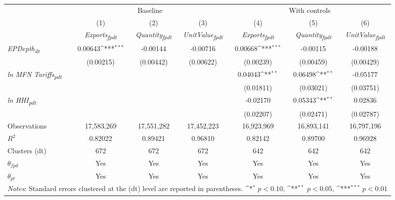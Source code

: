 {
\def\sym#1{\ifmmode^{#1}\else\(^{#1}\)\fi}
\begin{tabular}{l*{6}{c}}
\toprule
&\multicolumn{3}{c}{Baseline}&\multicolumn{3}{c}{With controls}\\\cmidrule(lr){2-4}\cmidrule(lr){5-7}
&(1)&(2)&(3)&(4)&(5)&(6)\\
&\textit{Exports\textsubscript{fpdt}}&\textit{Quantity\textsubscript{fpdt}}&\textit{UnitValue\textsubscript{fpdt}}&\textit{Exports\textsubscript{fpdt}}&\textit{Quantity\textsubscript{fpdt}}&\textit{UnitValue\textsubscript{fpdt}}\\
\midrule
\textit{EPDepth\textsubscript{dt}} & 0.00643\sym{***} & -0.00144 & -0.00716 & 0.00668\sym{***} & -0.00115 & -0.00188\\
 & (0.00215) & (0.00442) & (0.00622) & (0.00239) & (0.00459) & (0.00429)\\
\addlinespace
\textit{ln MFN Tariffs\textsubscript{pdt}} &  &  &  & 0.04043\sym{**} & 0.06498\sym{**} & -0.05177\\
 &  &  &  & (0.01811) & (0.03021) & (0.03751)\\
\addlinespace
\textit{ln HHI\textsubscript{pdt}} &  &  &  & -0.02170 & 0.05343\sym{**} & 0.02836\\
 &  &  &  & (0.02207) & (0.02471) & (0.02787)\\
\midrule
Observations & 17,583,269 & 17,551,282 & 17,452,223 & 16,923,969 & 16,893,141 & 16,797,196\\
$R^{2}$ & 0.82022 & 0.89421 & 0.96810 & 0.82142 & 0.89700 & 0.96928\\
Clusters (dt) & 672 & 672 & 672 & 642 & 642 & 642\\
$\theta_{fpd}$ & Yes & Yes & Yes & Yes & Yes & Yes\\
$\theta_{pt}$ & Yes & Yes & Yes & Yes & Yes & Yes\\
\bottomrule
\multicolumn{7}{l}{\footnotesize \textit{Notes}: Standard errors clustered at the (dt) level are reported in parentheses. \sym{*} \(p<0.10\), \sym{**} \(p<0.05\), \sym{***} \(p<0.01\)}\\
\end{tabular}
}
